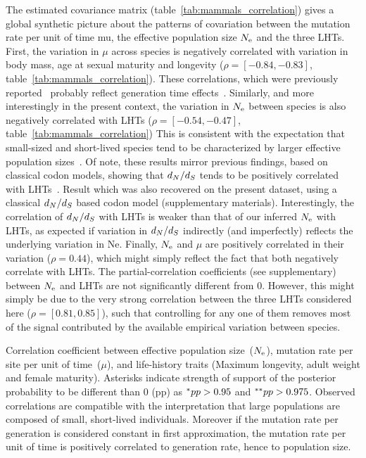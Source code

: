 \documentclass{MBE}
\begin{document}
	The estimated covariance matrix (table~\ref{tab:mammals_correlation}) gives a global synthetic picture about the patterns of covariation between the mutation rate per unit of time mu, the {effective population size} $N_{\text{e}}$ and the three {LHT}s.
	First, the variation in $\mu$ across species is negatively correlated with variation in body mass, age at sexual maturity and longevity ($\rho=[-0.84, -0.83]$, table~\ref{tab:mammals_correlation}).
	These correlations, which were previously reported~\citep{Lartillot2012,Nabholz2013} probably reflect generation time effects~\citep{Lanfear2010, Gao2016}.
	Similarly, and more interestingly in the present context, the variation in $N_{\text{e}}$ between species is also negatively correlated with {LHT}s ($\rho=[-0.54, -0.47]$, table~\ref{tab:mammals_correlation})
	This is consistent with the expectation that small-sized and short-lived species tend to be characterized by larger effective population sizes~\citep{Romiguier2014}.
	Of note, these results mirror previous findings, based on classical {codon} models, showing that $d_N / d_S$ tends to be positively correlated with {LHT}s~\citep{Lartillot2012,Nabholz2013,Figuet2017}.
	Result which was also recovered on the present dataset, using a classical $d_N / d_S$ based codon model (supplementary materials).
	Interestingly, the correlation of $d_N / d_S$ with LHTs is weaker than that of our inferred $N_{\text{e}}$ with LHTs, as expected if variation in $d_N / d_S$ indirectly (and imperfectly) reflects the underlying variation in Ne.
	Finally, $N_{\text{e}}$ and $\mu$ are positively correlated in their variation ($\rho = 0.44$), which might simply reflect the fact that both negatively correlate with {LHT}s.
	The partial-correlation coefficients (see supplementary) between $N_{\text{e}}$ and {LHT}s are not significantly different from 0.
	However, this might simply be due to the very strong correlation between the three {LHT}s considered here ($\rho=[0.81, 0.85]$), such that controlling for any one of them removes most of the signal contributed by the available empirical variation between species.

	\begin{table}[t]
		
		\caption[Traits correlation in mammals]{
			Correlation coefficient between effective population size~($N_{\text{e}}$), mutation rate per site per unit of time~($\mu$), and life-history traits (Maximum longevity, adult weight and female maturity).
			Asterisks indicate strength of support of the {posterior} probability to be different than $0$ (pp) as $\smash{^{*}} pp > 0.95$ and $\smash{^{**}} pp > 0.975$.
			Observed correlations are compatible with the interpretation that large populations are composed of small, short-lived individuals.
			Moreover if the mutation rate per generation is considered constant in first approximation, the mutation rate per unit of time is positively correlated to generation rate, hence to population size.
		}
		\label{tab:mammals_correlation}
	\end{table}
\end{document}
